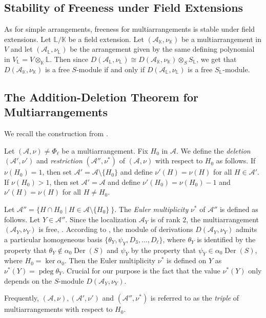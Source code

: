 \subsection{Stability of Freeness under Field Extensions}
\label{ssec:multistability}
As for simple arrangements, 
freeness for multiarrangements is
stable under field extensions.
Let ${{\mathbb L}}/{{\mathbb K}}$ be a field extension.
Let $({{\mathcal A}}_{{\mathbb K}}, \nu_{{\mathbb K}})$ be a multiarrangement in $V$ and let
$({{\mathcal A}}_{{\mathbb L}}, \nu_{{\mathbb L}})$ be the  arrangement given by the same
defining polynomial  in $V_{{\mathbb L}} = V \otimes_{{\mathbb K}} {{\mathbb L}}$.
Then since
$D({{\mathcal A}}_{{\mathbb L}}, \nu_{{\mathbb L}}) \cong D({{\mathcal A}}_{{\mathbb K}}, \nu_{{\mathbb K}}) \otimes_S S_{{\mathbb L}}$,
we get that
$D({{\mathcal A}}_{{\mathbb K}}, \nu_{{\mathbb K}})$ is a free $S$-module if and only if 
$D({{\mathcal A}}_{{\mathbb L}}, \nu_{{\mathbb L}})$ is a free $S_{{\mathbb L}}$-module.

\subsection{The Addition-Deletion Theorem for Multiarrangements}

We recall the construction from \cite{abeteraowakefield:euler}.

\begin{defn}
\label{def:Euler}
Let $({{\mathcal A}}, \nu) \ne \Phi_\ell$ be a multiarrangement. Fix $H_0$ in ${{\mathcal A}}$.
We define the \emph{deletion}  $({{\mathcal A}}', \nu')$ and \emph{restriction} $({{\mathcal A}}'', \nu^*)$
of $({{\mathcal A}}, \nu)$ with respect to $H_0$ as follows.
If $\nu(H_0) = 1$, then set ${{\mathcal A}}' = {{\mathcal A}} \setminus \{H_0\}$
and define $\nu'(H) = \nu(H)$ for all $H \in {{\mathcal A}}'$.
If $\nu(H_0) > 1$, then set ${{\mathcal A}}' = {{\mathcal A}}$
and define $\nu'(H_0) = \nu(H_0)-1$ and
$\nu'(H) = \nu(H)$ for all $H \ne H_0$.

Let ${{\mathcal A}}'' = \{ H \cap H_0 \mid H \in {{\mathcal A}} \setminus \{H_0\}\ \}$.
The \emph{Euler multiplicity} $\nu^*$ of ${{\mathcal A}}''$ is defined as follows.
Let $Y \in {{\mathcal A}}''$. Since the localization ${{\mathcal A}}_Y$ is of rank $2$, the
multiarrangement $({{\mathcal A}}_Y, \nu_Y)$ is free, 
\cite[Cor.\ 7]{ziegler:multiarrangements}. 
According to 
\cite[Prop.\ 2.1]{abeteraowakefield:euler},
the module of derivations 
$D({{\mathcal A}}_Y, \nu_Y)$ admits a particular homogeneous basis
$\{\theta_Y, \psi_Y, D_3, \ldots, D_\ell\}$,
where $\theta_Y$ is identified by the 
property that $\theta_Y \notin \alpha_0 {{\operatorname{Der}}}(S)$
and $\psi_Y$ by the 
property that $\psi_Y \in \alpha_0 {{\operatorname{Der}}}(S)$,
where $H_0 = \ker \alpha_0$.
Then the Euler multiplicity $\nu^*$ is defined
on $Y$ as $\nu^*(Y) = {\operatorname{pdeg}} \theta_Y$.
Crucial for our purpose is the fact that the value $\nu^*(Y)$ 
only depends on the $S$-module $D({{\mathcal A}}_Y, \nu_Y)$.

Frequently, $({{\mathcal A}}, \nu), ({{\mathcal A}}', \nu')$ and $({{\mathcal A}}'', \nu^*)$ 
is referred to as the \emph{triple} of multiarrangements with respect to $H_0$. 
\end{defn}


